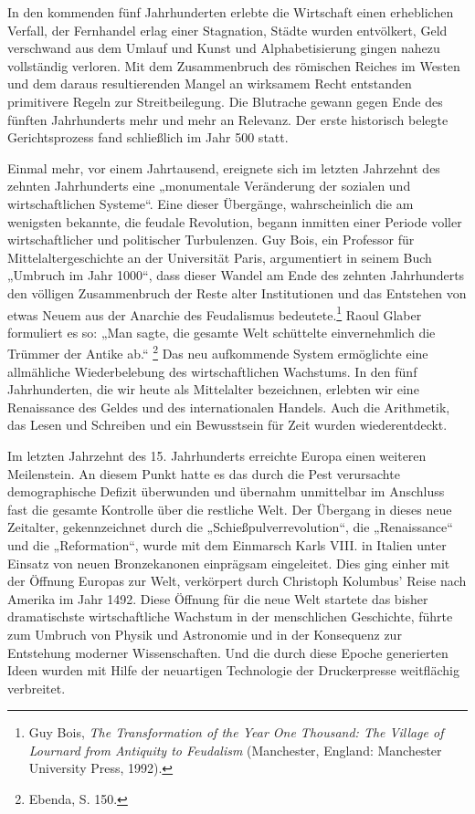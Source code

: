 \documentclass[
  a5paper,
  smalldemyvopaper,10pt,twoside,onecolumn,openright,extrafontsizes,hidelinks]{memoir}
\begin{document}
In den kommenden fünf Jahrhunderten erlebte die Wirtschaft einen
erheblichen Verfall, der Fernhandel erlag einer Stagnation, Städte
wurden entvölkert, Geld verschwand aus dem Umlauf und Kunst und
Alphabetisierung gingen nahezu vollständig verloren. Mit dem
Zusammenbruch des römischen Reiches im Westen und dem daraus
resultierenden Mangel an wirksamem Recht entstanden primitivere Regeln
zur Streitbeilegung. Die Blutrache gewann gegen Ende des fünften
Jahrhunderts mehr und mehr an Relevanz. Der erste historisch belegte
Gerichtsprozess fand schließlich im Jahr 500 statt.

Einmal mehr, vor einem Jahrtausend, ereignete sich im letzten Jahrzehnt
des zehnten Jahrhunderts eine „monumentale Veränderung der sozialen und
wirtschaftlichen Systeme``. Eine dieser Übergänge, wahrscheinlich die am
wenigsten bekannte, die feudale Revolution, begann inmitten einer
Periode voller wirtschaftlicher und politischer Turbulenzen. Guy Bois,
ein Professor für Mittelaltergeschichte an der Universität Paris,
argumentiert in seinem Buch „Umbruch im Jahr 1000``, dass dieser Wandel
am Ende des zehnten Jahrhunderts den völligen Zusammenbruch der Reste
alter Institutionen und das Entstehen von etwas Neuem aus der Anarchie
des Feudalismus bedeutete.\footnote{Guy Bois, \emph{The Transformation
  of the Year One Thousand: The Village of Lournard from Antiquity to
  Feudalism} (Manchester, England: Manchester University Press, 1992).}
Raoul Glaber formuliert es so: „Man sagte, die gesamte Welt schüttelte
einvernehmlich die Trümmer der Antike ab.`` \footnote{Ebenda, S. 150.}
Das neu aufkommende System ermöglichte eine allmähliche Wiederbelebung
des wirtschaftlichen Wachstums. In den fünf Jahrhunderten, die wir heute
als Mittelalter bezeichnen, erlebten wir eine Renaissance des Geldes und
des internationalen Handels. Auch die Arithmetik, das Lesen und
Schreiben und ein Bewusstsein für Zeit wurden wiederentdeckt.

Im letzten Jahrzehnt des 15. Jahrhunderts erreichte Europa einen
weiteren Meilenstein. An diesem Punkt hatte es das durch die Pest
verursachte demographische Defizit überwunden und übernahm unmittelbar
im Anschluss fast die gesamte Kontrolle über die restliche Welt. Der
Übergang in dieses neue Zeitalter, gekennzeichnet durch die
„Schießpulverrevolution``, die „Renaissance`` und die „Reformation``,
wurde mit dem Einmarsch Karls VIII. in Italien unter Einsatz von neuen
Bronzekanonen einprägsam eingeleitet. Dies ging einher mit der Öffnung
Europas zur Welt, verkörpert durch Christoph Kolumbus' Reise nach
Amerika im Jahr 1492. Diese Öffnung für die neue Welt startete das
bisher dramatischste wirtschaftliche Wachstum in der menschlichen
Geschichte, führte zum Umbruch von Physik und Astronomie und in der
Konsequenz zur Entstehung moderner Wissenschaften. Und die durch diese
Epoche generierten Ideen wurden mit Hilfe der neuartigen Technologie der
Druckerpresse weitflächig verbreitet.
\end{document}
